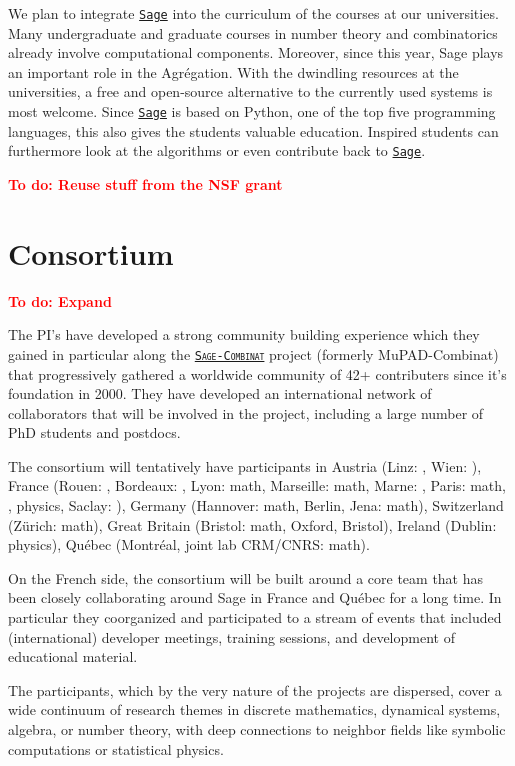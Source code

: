 \documentclass[a4,12pt]{amsart}
\newcommand{\sage}{\href{http://www.sagemath.org/}{\texttt{Sage}}\xspace}
\newcommand{\sagecombinat}{\href{http://wiki.sagemath.org/combinat/}{\texttt{Sage-Combinat}}\xspace}
\newcommand{\TODO}[2][To do: ]{{\textcolor{red}{\textbf{#1#2}}}}
\begin{document}
We plan to integrate \sage into the curriculum of the courses at our
universities. Many undergraduate and graduate courses in number theory
and combinatorics already involve computational components. Moreover,
since this year, Sage plays an important role in the Agrégation. With
the dwindling resources at the universities, a free and open-source
alternative to the currently used systems %
is most welcome. Since \sage is based on Python, one of the top five
programming languages, this also gives the students valuable
education.  Inspired students can furthermore look at the algorithms
or even contribute back to \sage.

\TODO{Reuse stuff from the NSF grant}

\section{Consortium}

\TODO{Expand}

The PI's have developed a strong community building experience which
they gained in particular along the \textsc{\sagecombinat} project
(formerly MuPAD-Combinat) that progressively gathered a worldwide
community of 42+ contributers since it's foundation in 2000. They have
developed an international network of collaborators that will be
involved in the project, including a large number of PhD students and
postdocs.

The consortium will tentatively have participants in Austria (Linz:
\cs, Wien: \cs), France (Rouen: \cs, Bordeaux: \cs, Lyon: math,
Marseille: math, Marne: \cs, Paris: math, \cs, physics, Saclay: \cs),
Germany (Hannover: math, Berlin, Jena: math), Switzerland (Zürich:
math), Great Britain (Bristol: math, Oxford, Bristol), Ireland
(Dublin: physics), Québec (Montréal, joint lab CRM/CNRS: math).

On the French side, the consortium will be built around a core team
that has been closely collaborating around Sage in France and Québec
for a long time.
In particular they coorganized and participated to a stream of events
that included (international) developer meetings, training sessions,
and development of educational material.

The participants, which by the very nature of the projects are
dispersed, cover a wide continuum of research themes in discrete
mathematics, dynamical systems, algebra, or number theory, with deep
connections to neighbor fields like symbolic computations or
statistical physics.
\end{document}
